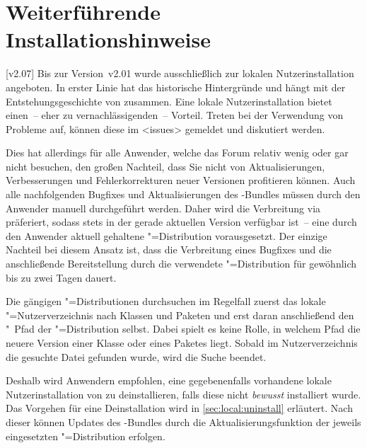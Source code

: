 \chapter{%
  Weiterführende Installationshinweise%
  \label{sec:install:ext}%
}

[v2.07]
\bigskip\noindent
Bis zur Version~v2.01 wurde \TUDScript ausschließlich zur lokalen 
Nutzerinstallation angeboten. In erster Linie hat das historische 
Hintergründe und hängt mit der Entstehungsgeschichte von \TUDScript zusammen. 
Eine lokale Nutzerinstallation bietet einen~-- eher zu vernachlässigenden~-- 
Vorteil. Treten bei der Verwendung von \TUDScript Probleme auf, können diese im 
\GitHubRepo<issues> gemeldet und diskutiert werden.

Dies hat allerdings für alle Anwender, welche das Forum relativ wenig oder gar 
nicht besuchen, den großen Nachteil, dass Sie nicht von Aktualisierungen, 
Verbesserungen und Fehlerkorrekturen neuer Versionen profitieren können. Auch 
alle nachfolgenden Bugfixes und Aktualisierungen des \TUDScript-Bundles müssen 
durch den Anwender manuell durchgeführt werden. Daher wird die Verbreitung via 
 präferiert, sodass \TUDScript stets in der gerade aktuellen 
Version verfügbar ist~-- eine durch den Anwender aktuell gehaltene 
"=Distribution vorausgesetzt. Der einzige Nachteil bei diesem 
Ansatz ist, dass die Verbreitung eines Bugfixes und die anschließende 
Bereitstellung durch die verwendete "=Distribution für gewöhnlich 
bis zu zwei Tagen dauert.

Die gängigen "=Distributionen durchsuchen im Regelfall zuerst das 
lokale "=Nutzerverzeichnis nach Klassen und Paketen und erst daran 
anschließend den "~Pfad der "=Distribution selbst. 
Dabei spielt es keine Rolle, in welchem Pfad die neuere Version einer Klasse 
oder eines Paketes liegt. Sobald im Nutzerverzeichnis die gesuchte Datei 
gefunden wurde, wird die Suche beendet.

Deshalb wird Anwendern empfohlen, eine gegebenenfalls vorhandene lokale 
Nutzerinstallation von \TUDScript zu deinstallieren, falls diese nicht 
\emph{bewusst} installiert wurde. Das Vorgehen für eine Deinstallation wird in 
\autoref{sec:local:uninstall} erläutert. Nach dieser können Updates des 
\TUDScript-Bundles durch die Aktualisierungsfunktion der jeweils eingesetzten 
"=Distribution erfolgen. 

